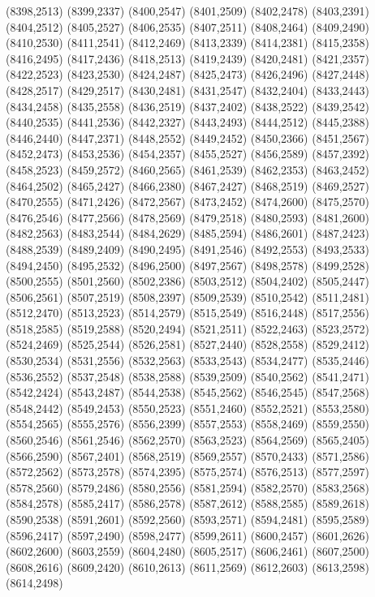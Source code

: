 (8398,2513)
(8399,2337)
(8400,2547)
(8401,2509)
(8402,2478)
(8403,2391)
(8404,2512)
(8405,2527)
(8406,2535)
(8407,2511)
(8408,2464)
(8409,2490)
(8410,2530)
(8411,2541)
(8412,2469)
(8413,2339)
(8414,2381)
(8415,2358)
(8416,2495)
(8417,2436)
(8418,2513)
(8419,2439)
(8420,2481)
(8421,2357)
(8422,2523)
(8423,2530)
(8424,2487)
(8425,2473)
(8426,2496)
(8427,2448)
(8428,2517)
(8429,2517)
(8430,2481)
(8431,2547)
(8432,2404)
(8433,2443)
(8434,2458)
(8435,2558)
(8436,2519)
(8437,2402)
(8438,2522)
(8439,2542)
(8440,2535)
(8441,2536)
(8442,2327)
(8443,2493)
(8444,2512)
(8445,2388)
(8446,2440)
(8447,2371)
(8448,2552)
(8449,2452)
(8450,2366)
(8451,2567)
(8452,2473)
(8453,2536)
(8454,2357)
(8455,2527)
(8456,2589)
(8457,2392)
(8458,2523)
(8459,2572)
(8460,2565)
(8461,2539)
(8462,2353)
(8463,2452)
(8464,2502)
(8465,2427)
(8466,2380)
(8467,2427)
(8468,2519)
(8469,2527)
(8470,2555)
(8471,2426)
(8472,2567)
(8473,2452)
(8474,2600)
(8475,2570)
(8476,2546)
(8477,2566)
(8478,2569)
(8479,2518)
(8480,2593)
(8481,2600)
(8482,2563)
(8483,2544)
(8484,2629)
(8485,2594)
(8486,2601)
(8487,2423)
(8488,2539)
(8489,2409)
(8490,2495)
(8491,2546)
(8492,2553)
(8493,2533)
(8494,2450)
(8495,2532)
(8496,2500)
(8497,2567)
(8498,2578)
(8499,2528)
(8500,2555)
(8501,2560)
(8502,2386)
(8503,2512)
(8504,2402)
(8505,2447)
(8506,2561)
(8507,2519)
(8508,2397)
(8509,2539)
(8510,2542)
(8511,2481)
(8512,2470)
(8513,2523)
(8514,2579)
(8515,2549)
(8516,2448)
(8517,2556)
(8518,2585)
(8519,2588)
(8520,2494)
(8521,2511)
(8522,2463)
(8523,2572)
(8524,2469)
(8525,2544)
(8526,2581)
(8527,2440)
(8528,2558)
(8529,2412)
(8530,2534)
(8531,2556)
(8532,2563)
(8533,2543)
(8534,2477)
(8535,2446)
(8536,2552)
(8537,2548)
(8538,2588)
(8539,2509)
(8540,2562)
(8541,2471)
(8542,2424)
(8543,2487)
(8544,2538)
(8545,2562)
(8546,2545)
(8547,2568)
(8548,2442)
(8549,2453)
(8550,2523)
(8551,2460)
(8552,2521)
(8553,2580)
(8554,2565)
(8555,2576)
(8556,2399)
(8557,2553)
(8558,2469)
(8559,2550)
(8560,2546)
(8561,2546)
(8562,2570)
(8563,2523)
(8564,2569)
(8565,2405)
(8566,2590)
(8567,2401)
(8568,2519)
(8569,2557)
(8570,2433)
(8571,2586)
(8572,2562)
(8573,2578)
(8574,2395)
(8575,2574)
(8576,2513)
(8577,2597)
(8578,2560)
(8579,2486)
(8580,2556)
(8581,2594)
(8582,2570)
(8583,2568)
(8584,2578)
(8585,2417)
(8586,2578)
(8587,2612)
(8588,2585)
(8589,2618)
(8590,2538)
(8591,2601)
(8592,2560)
(8593,2571)
(8594,2481)
(8595,2589)
(8596,2417)
(8597,2490)
(8598,2477)
(8599,2611)
(8600,2457)
(8601,2626)
(8602,2600)
(8603,2559)
(8604,2480)
(8605,2517)
(8606,2461)
(8607,2500)
(8608,2616)
(8609,2420)
(8610,2613)
(8611,2569)
(8612,2603)
(8613,2598)
(8614,2498)

